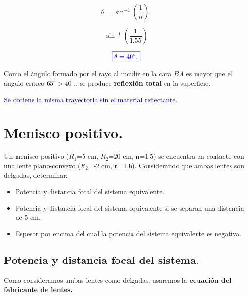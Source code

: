 \documentclass[a4paper,12pt]{article} %
\begin{document}
\[\theta = \sin^{-1}\left(\frac{1}{n}\right).\]

\[ \sin^{-1}\left(\frac{1}{1.55}\right) \]

\vspace{\baselineskip}

\[\textcolor{blue}{\boxed{\theta = 40^\circ.}} \]

\begin{justify}
	Como el ángulo formado por el rayo al incidir en la cara \(BA\) es mayor que el ángulo crítico \(65^\circ > 40^\circ.\), se produce \textbf{reflexión total} en la superficie.
\end{justify}

\begin{justify}
	\centering
	\textcolor{blue}{Se obtiene la misma trayectoria sin el material reflectante.}
\end{justify}

\vspace{\baselineskip}

\section{Menisco positivo.}

\begin{justify}
	Un menisco positivo (\(R_1\)=5 cm, \(R_2\)=20 cm, n=1.5) se encuentra en contacto con una lente plano-convexo (\(R_2\)=-2 cm, n=1.6).  Considerando que ambas lentes son delgadas, determinar:
\end{justify}

\begin{itemize}
	\item Potencia y distancia focal del sistema equivalente.
	\item Potencia y distancia focal del sistema equivalente si se separan una distancia de 5 cm. 
	\item Espesor por encima del cual la potencia del sistema equivalente es negativa.
\end{itemize}

\subsection{Potencia y distancia focal del sistema.}

\begin{justify}
	Como consideramos ambas lentes como delgadas, usaremos la \textbf{ecuación del fabricante de lentes.}
\end{justify}
\end{document}
